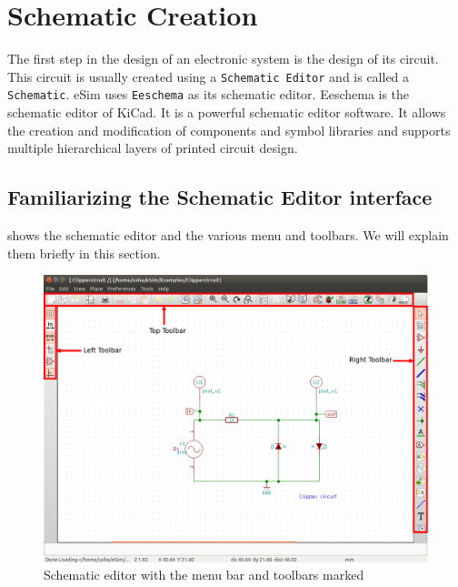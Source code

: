 
%

\chapter{Schematic Creation}
\thispagestyle{empty}
\label{chap5}
The first step in the design of an electronic system is the design of
its circuit. This circuit is usually created using a {\tt Schematic
  Editor} and is called a {\tt
  Schematic}.  eSim uses {\tt Eeschema}
 as its schematic editor. Eeschema is the schematic
editor of KiCad.   It is a powerful schematic editor
software. It allows the creation and modification of components and
symbol libraries and supports multiple hierarchical layers of printed
circuit design.

\section{Familiarizing the Schematic Editor interface}
 shows the schematic editor and the various menu and
toolbars.  We will explain them briefly in this section.
\begin{figure}[h]
\begin{center}
\includegraphics[width=\linewidth]{manual_images/schematic1.png}
\caption{Schematic editor with the menu bar and toolbars marked}
\label{eesch1}
\end{center}
\end{figure}

